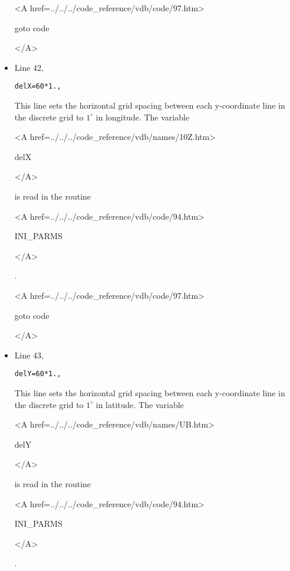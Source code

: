 \begin{itemize}
{\bf
\begin{rawhtml} <A href=../../../code_reference/vdb/code/97.htm> \end{rawhtml}
goto code
\begin{rawhtml} </A>\end{rawhtml}
}

\item Line 42,
\begin{verbatim}
delX=60*1.,
\end{verbatim}
This line sets the horizontal grid spacing between each y-coordinate line
in the discrete grid to $1^{\circ}$ in longitude.
The variable
{\bf
\begin{rawhtml} <A href=../../../code_reference/vdb/names/10Z.htm> \end{rawhtml}
delX
\begin{rawhtml} </A>\end{rawhtml}
}
is read in the routine
{\it
\begin{rawhtml} <A href=../../../code_reference/vdb/code/94.htm> \end{rawhtml}
INI\_PARMS
\begin{rawhtml} </A>\end{rawhtml}
}.

{\bf
\begin{rawhtml} <A href=../../../code_reference/vdb/code/97.htm> \end{rawhtml}
goto code
\begin{rawhtml} </A>\end{rawhtml}
}

\item Line 43,
\begin{verbatim}
delY=60*1.,
\end{verbatim}
This line sets the horizontal grid spacing between each y-coordinate line
in the discrete grid to $1^{\circ}$ in latitude.
The variable
{\bf
\begin{rawhtml} <A href=../../../code_reference/vdb/names/UB.htm> \end{rawhtml}
delY   
\begin{rawhtml} </A>\end{rawhtml}
}
is read in the routine
{\it
\begin{rawhtml} <A href=../../../code_reference/vdb/code/94.htm> \end{rawhtml}
INI\_PARMS
\begin{rawhtml} </A>\end{rawhtml}
}.


\end{itemize}
